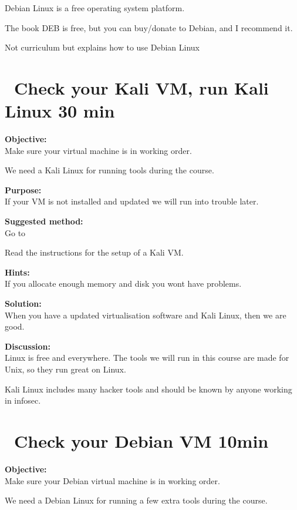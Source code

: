 \documentclass[a4paper,11pt,notitlepage]{report}
\begin{document}
Debian Linux is a free operating system platform.

The book DEB is free, but you can buy/donate to Debian, and I recommend it.

Not curriculum but explains how to use Debian Linux




\chapter{\faExclamationTriangle\ Check your Kali VM, run Kali Linux 30 min}
\label{ex:basicVM}


{\bf Objective:}\\
Make sure your virtual machine is in working order.

We need a Kali Linux for running tools during the course.

{\bf Purpose:}\\
If your VM is not installed and updated we will run into trouble later.

{\bf Suggested method:}\\
Go to 

Read the instructions for the setup of a Kali VM.

{\bf Hints:}\\
If you allocate enough memory and disk you wont have problems.

{\bf Solution:}\\
When you have a updated virtualisation software and Kali Linux, then we are good.

{\bf Discussion:}\\
Linux is free and everywhere. The tools we will run in this course are made for Unix, so they run great on Linux.

Kali Linux includes many hacker tools and should be known by anyone working in infosec.

\chapter{\faExclamationTriangle\ Check your Debian VM 10min}
\label{ex:basicDebianVM}


{\bf Objective:}\\
Make sure your Debian virtual machine is in working order.

We need a Debian Linux for running a few extra tools during the course.
\end{document}
